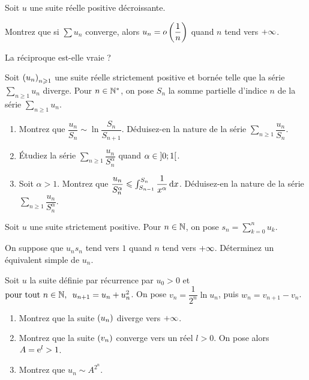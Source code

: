 \begin{exoss}[Exercice 16]
Soit \(u\) une suite réelle positive décroissante.

Montrez que si \(\sum u_n\) converge, alors \(u_n=o\left(\dfrac{1}{n}\right)\) quand \(n\) tend vers \(+\infty\).

La réciproque est-elle vraie ?
\end{exoss}



\begin{exoss}[Exercice 17]
Soit \(\left(u_n\right)_{n\geqslant1}\) une suite réelle strictement positive et bornée telle que la série \(\sum_{n\geq1}u_n\) diverge. Pour \(n\in\mathbb{N}^*\), on pose \(S_n\) la somme partielle d'indice \(n\) de la série \(\sum_{n\geq1}u_n\).

\begin{enumerate}
    \item Montrez que \(\dfrac{u_n}{S_n}\sim\ln\dfrac{S_n}{S_{n+1}}\). Déduisez-en la nature de la série \(\sum_{n\geq1}\dfrac{u_n}{S_n}\). \\
    \item Étudiez la série \(\sum_{n\geq1}\dfrac{u_n}{S_n^\alpha}\) quand \(\alpha\in\left]0;1\right[\). \\
    \item Soit \(\alpha>1\). Montrez que \(\dfrac{u_n}{S_n^\alpha}\leq\int_{S_{n-1}}^{S_n}\dfrac{1}{x^\alpha}\odif{x}\). Déduisez-en la nature de la série \(\sum_{n\geq1}\dfrac{u_n}{S_n^\alpha}\).
\end{enumerate}
\end{exoss}



\begin{exoss}[Exercice 18]
Soit \(u\) une suite strictement positive. Pour \(n\in\mathbb{N}\), on pose \(s_n=\sum_{k=0}^nu_k\).

On suppose que \(u_ns_n\) tend vers \(1\) quand \(n\) tend vers \(+\infty\). Déterminez un équivalent simple de \(u_n\).
\end{exoss}



\begin{exoss}[Exercice 19]
Soit \(u\) la suite définie par récurrence par \(u_0>0\) et \(\quantifs{\tpt n\in\N}u_{n+1}=u_n+u_n^2\). On pose \(v_n=\dfrac{1}{2^n}\ln u_n\), puis \(w_n=v_{n+1}-v_n\).

\begin{enumerate}
    \item Montrez que la suite \(\left(u_n\right)\) diverge vers \(+\infty\). \\
    \item Montrez que la suite \(\left(v_n\right)\) converge vers un réel \(l>0\). On pose alors \(A=\mathrm{e}^{l}>1\). \\
    \item Montrez que \(u_n\sim A^{2^n}\).
\end{enumerate}
\end{exoss}



